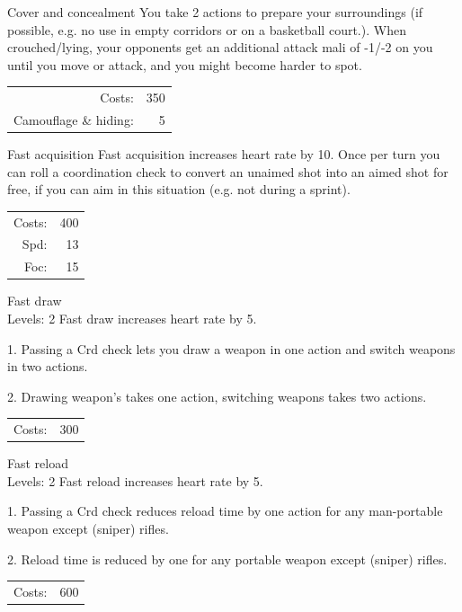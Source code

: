 \begin{skill}{Cover and concealment}
	\setlength{\parskip}{8pt}
	\setlength{\parindent}{0pt}
	You take 2 actions to prepare your surroundings (if possible, e.g. no use in empty corridors or on a basketball court.). When crouched/lying, your opponents get an additional attack mali of -1/-2 on you until you move or attack, and you might become harder to spot.\\

	\hfill
	\begin{tabular}{rr}
		Costs: & 350 \\
		Camouflage \& hiding: & 5 \\
	\end{tabular}
\end{skill}

\begin{skill}{Fast acquisition}
	\setlength{\parskip}{8pt}
	\setlength{\parindent}{0pt}
	Fast acquisition increases heart rate by 10. Once per turn you can roll a coordination check to convert an unaimed shot into an aimed shot for free, if you can aim in this situation (e.g. not during a sprint).\\

	\hfill
	\begin{tabular}{rr}
		Costs: & 400 \\
		Spd: & 13 \\
		Foc: & 15 \\
	\end{tabular}
\end{skill}

\begin{skill}{Fast draw \\\phantom{a}\hfill Levels: 2}
	\setlength{\parskip}{8pt}
	\setlength{\parindent}{0pt}
	Fast draw increases heart rate by 5.

	1. Passing a Crd check lets you draw a weapon in one action and switch weapons in two actions.

	2. Drawing weapon’s takes one action, switching weapons takes two actions.\\

	\hfill
	\begin{tabular}{rr}
		Costs: & 300 \\
	\end{tabular}
\end{skill}

\begin{skill}{Fast reload \\\phantom{a}\hfill Levels: 2}
	\setlength{\parskip}{8pt}
	\setlength{\parindent}{0pt}
	Fast reload increases heart rate by 5.

	1. Passing a Crd check reduces reload time by one action for any man-portable weapon except (sniper) rifles.

	2. Reload time is reduced by one for any portable weapon except (sniper) rifles.\\

	\hfill
	\begin{tabular}{rr}
		Costs: & 600 \\
	\end{tabular}
\end{skill}

